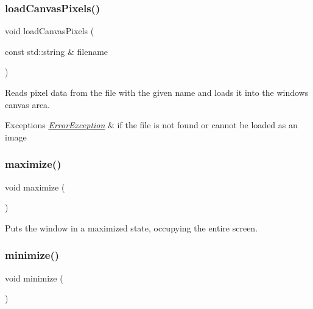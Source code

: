 \subsubsection{\texorpdfstring{load\+Canvas\+Pixels()}{loadCanvasPixels()}}
{\footnotesize\ttfamily void load\+Canvas\+Pixels (\begin{DoxyParamCaption}\item[{const std\+::string \&}]{filename }\end{DoxyParamCaption})\hspace{0.3cm}{\ttfamily [virtual]}}



Reads pixel data from the file with the given name and loads it into the window\textquotesingle{}s canvas area. 


\begin{DoxyExceptions}{Exceptions}
{\em \mbox{\hyperlink{classErrorException}{Error\+Exception}}} & if the file is not found or cannot be loaded as an image \\
\hline
\end{DoxyExceptions}
\mbox{\label{classGWindow_a1aa481996525792213f28d91fbb4894b}} 
\subsubsection{\texorpdfstring{maximize()}{maximize()}}
{\footnotesize\ttfamily void maximize (\begin{DoxyParamCaption}{ }\end{DoxyParamCaption})\hspace{0.3cm}{\ttfamily [virtual]}}



Puts the window in a maximized state, occupying the entire screen. 

\mbox{\label{classGWindow_a85ffaebe489c0ecf8051715ecf59babb}} 
\subsubsection{\texorpdfstring{minimize()}{minimize()}}
{\footnotesize\ttfamily void minimize (\begin{DoxyParamCaption}{ }\end{DoxyParamCaption})\hspace{0.3cm}{\ttfamily [virtual]}}



